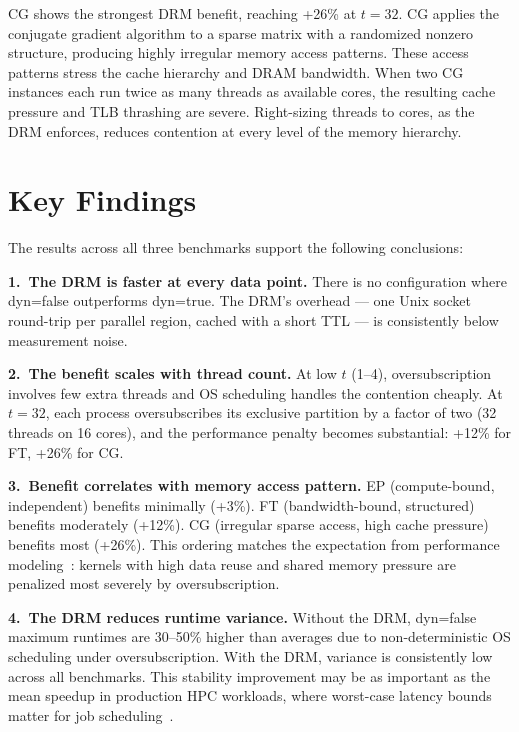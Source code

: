 CG shows the strongest DRM benefit, reaching +26\% at $t=32$. CG applies the conjugate gradient algorithm to a sparse matrix with a randomized nonzero structure, producing highly irregular memory access patterns. These access patterns stress the cache hierarchy and DRAM bandwidth. When two CG instances each run twice as many threads as available cores, the resulting cache pressure and TLB thrashing are severe. Right-sizing threads to cores, as the DRM enforces, reduces contention at every level of the memory hierarchy.

\section{Key Findings}

The results across all three benchmarks support the following conclusions:

\textbf{1.\ The DRM is faster at every data point.} There is no configuration where dyn=false outperforms dyn=true. The DRM's overhead --- one Unix socket round-trip per parallel region, cached with a short TTL --- is consistently below measurement noise.

\textbf{2.\ The benefit scales with thread count.} At low $t$ (1--4), oversubscription involves few extra threads and OS scheduling handles the contention cheaply. At $t=32$, each process oversubscribes its exclusive partition by a factor of two (32 threads on 16 cores), and the performance penalty becomes substantial: +12\% for FT, +26\% for CG.

\textbf{3.\ Benefit correlates with memory access pattern.} EP (compute-bound, independent) benefits minimally (+3\%). FT (bandwidth-bound, structured) benefits moderately (+12\%). CG (irregular sparse access, high cache pressure) benefits most (+26\%). This ordering matches the expectation from performance modeling~\parencite{Amdahl1967}: kernels with high data reuse and shared memory pressure are penalized most severely by oversubscription.

\textbf{4.\ The DRM reduces runtime variance.} Without the DRM, dyn=false maximum runtimes are 30--50\% higher than averages due to non-deterministic OS scheduling under oversubscription. With the DRM, variance is consistently low across all benchmarks. This stability improvement may be as important as the mean speedup in production HPC workloads, where worst-case latency bounds matter for job scheduling~\parencite{yoo2003slurm}.
